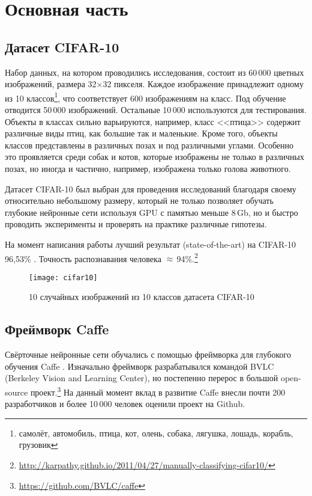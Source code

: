 \section{Основная часть}
\subsection{Датасет CIFAR-10}
Набор данных, на котором проводились исследования, состоит из 60\,000 цветных изображений, размера 
32$\times$32 пикселя. Каждое изображение принадлежит одному из 10 классов\footnote{самолёт, автомобиль, птица,
кот, олень, собака, лягушка, лошадь, корабль, грузовик}, что соответствует 600 изображениям на класс. Под 
обучение отводится 50\,000 изображений. Остальные 10\,000 используются для тестирования. Объекты в классах сильно варьируются, 
например, класс <<птица>> содержит различные виды птиц, как большие так и маленькие. Кроме того, объекты классов представлены в 
различных позах и под различными углами. Особенно это проявляется среди собак и котов, которые изображены не только в различных 
позах, но иногда и частично, например, изображена только голова животного.

Датасет CIFAR-10 \cite{learningmultiple} был выбран для проведения исследований благодаря своему относительно небольшому размеру, 
который не только позволяет обучать глубокие нейронные сети используя GPU с памятью меньше 8\,Gb, но и быстро проводить эксперименты
и проверять на практике различные гипотезы.

На момент написания работы лучший результат (state-of-the-art) на CIFAR-10 96,53\% \cite{2014arXiv1412}. Точность  
распознавания человека $\approx$\,94\%.\footnote{\url{http://karpathy.github.io/2011/04/27/manually-classifying-cifar10/}}

\begin{figure}[h]
\centering
\texttt{[image: cifar10]}
\caption{10 случайных изображений из 10 классов датасета CIFAR-10}
\end{figure}

\subsection{Фреймворк Caffe}
Свёрточные нейронные сети обучались с помощью фреймворка для глубокого обучения Caffe \cite{jia2014caffe}.
Изначально фреймворк разрабатывался командой BVLC (Berkeley Vision and Learning Center), но постепенно перерос в большой 
open-source проект.\footnote{\url{https://github.com/BVLC/caffe}} На данный момент вклад в развитие Caffe внесли почти 200 
разработчиков и более 10\,000 человек оценили проект на Github.

